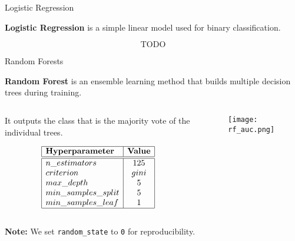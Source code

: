 \begin{frame}{Logistic Regression}

    \textbf{Logistic Regression} is a simple linear model used for binary classification.

    $$
    \text{TODO}
    $$

\end{frame}

\begin{frame}{Random Forests}

    \textbf{Random Forest} is an ensemble learning method that builds multiple decision trees during training. 

    \begin{columns}
        \begin{column}{0.45\textwidth}
            It outputs the class that is the majority vote of the individual trees.

            \vspace{1em}

            {\small
            $$
            \begin{array}{|l|c|}
                \hline
                \textbf{Hyperparameter} & \textbf{Value} \\
                \hline
                \hline
                n\_estimators & 125 \\
                criterion & gini \\
                max\_depth & 5 \\
                min\_samples\_split & 5 \\
                min\_samples\_leaf & 1 \\
                \hline
            \end{array}
            $$
            }
        \end{column}
        \begin{column}{0.55\textwidth}
            \begin{figure}
                \centering
                \vfill
                \texttt{[image: rf\_auc.png]}
            \end{figure}
        \end{column}
    \end{columns}

        \begin{footnotesize}
            \centering
            \textbf{Note:} We set \texttt{random\_state} to \texttt{0} for reproducibility.
        \end{footnotesize}
\end{frame}

